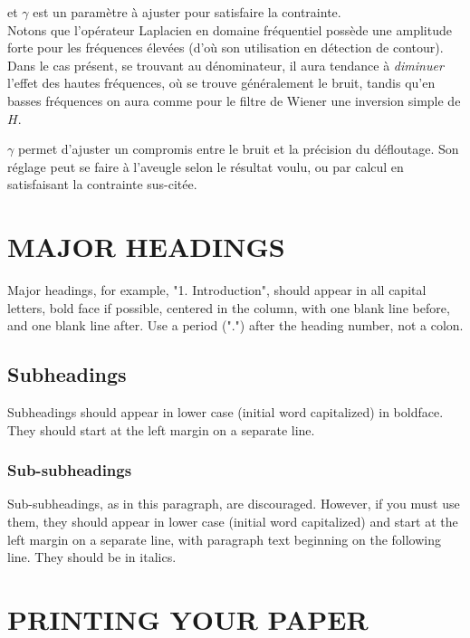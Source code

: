 \documentclass{article}
\begin{document}
	et $\gamma$ est un paramètre à ajuster pour satisfaire la contrainte.
	\\
	
	Notons que l'opérateur Laplacien en domaine fréquentiel possède une amplitude forte pour les fréquences élevées (d'où son utilisation en détection de contour). Dans le cas présent, se trouvant au dénominateur, il aura tendance à \textit{diminuer} l'effet des hautes fréquences, où se trouve généralement le bruit, tandis qu'en basses fréquences on aura comme pour le filtre de Wiener une inversion simple de $H$.
	
	$\gamma$ permet d'ajuster un compromis entre le bruit et la précision du défloutage. Son réglage peut se faire à l'aveugle selon le résultat voulu, ou par calcul en satisfaisant la contrainte sus-citée. 

\section{MAJOR HEADINGS}
\label{sec:majhead}

Major headings, for example, "1. Introduction", should appear in all capital
letters, bold face if possible, centered in the column, with one blank line
before, and one blank line after. Use a period (".") after the heading number,
not a colon.

\subsection{Subheadings}
\label{ssec:subhead}

Subheadings should appear in lower case (initial word capitalized) in
boldface.  They should start at the left margin on a separate line.
 
\subsubsection{Sub-subheadings}
\label{sssec:subsubhead}

Sub-subheadings, as in this paragraph, are discouraged. However, if you
must use them, they should appear in lower case (initial word
capitalized) and start at the left margin on a separate line, with paragraph
text beginning on the following line.  They should be in italics.

\section{PRINTING YOUR PAPER}
\label{sec:print}
\end{document}
